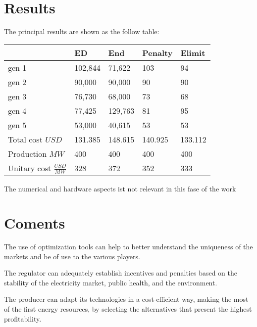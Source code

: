 \documentclass{article}
\begin{document}
\section{Results}

The principal results are shown as the follow table:

\begin{table}[H]
\begin{tabular}{l|l|l|l|l|}
\cline{2-5}
                                 & ED      & End     & Penalty & Elimit  \\ \hline
\multicolumn{1}{|l|}{gen 1}      & 102,844 & 71,622  & 103     & 94      \\ \hline
\multicolumn{1}{|l|}{gen 2}      & 90,000  & 90,000  & 90      & 90      \\ \hline
\multicolumn{1}{|l|}{gen 3}      & 76,730  & 68,000  & 73      & 68      \\ \hline
\multicolumn{1}{|l|}{gen 4}      & 77,425  & 129,763 & 81      & 95      \\ \hline
\multicolumn{1}{|l|}{gen 5}      & 53,000  & 40,615  & 53      & 53      \\ \hline
\multicolumn{1}{|l|}{Total cost $USD$} & 131.385 & 148.615 & 140.925 & 133.112 \\ \hline
\multicolumn{1}{|l|}{Production $MW$} & 400     & 400     & 400     & 400     \\ \hline
\multicolumn{1}{|l|}{Unitary cost $\frac{USD}{MW}$}     & 328     & 372     & 352     & 333     \\ \hline
\end{tabular}
\label{tabla1}
\end{table}

The numerical and hardware aspects ist not relevant in this fase of the work

\section{Coments}

The use of optimization tools can help to better understand the uniqueness of the markets and be of use to the various players.

The regulator can adequately establish incentives and penalties based on the stability of the electricity market, public health, and the environment.

The producer can adapt its technologies in a cost-efficient way, making the most of the first energy resources, by selecting the alternatives that present the highest profitability.
\end{document}
